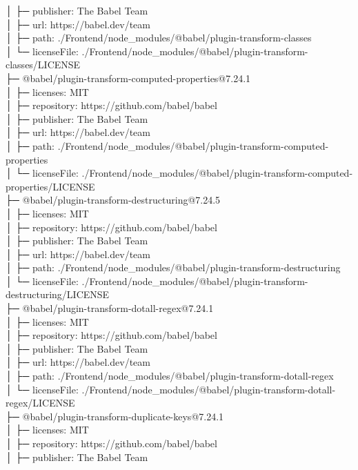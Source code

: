 │  ├─ publisher: The Babel Team\\
│  ├─ url: https://babel.dev/team\\
│  ├─ path: ./Frontend/node\_modules/@babel/plugin-transform-classes\\
│  └─ licenseFile: ./Frontend/node\_modules/@babel/plugin-transform-classes/LICENSE\\
├─ @babel/plugin-transform-computed-properties@7.24.1\\
│  ├─ licenses: MIT\\
│  ├─ repository: https://github.com/babel/babel\\
│  ├─ publisher: The Babel Team\\
│  ├─ url: https://babel.dev/team\\
│  ├─ path: ./Frontend/node\_modules/@babel/plugin-transform-computed-properties\\
│  └─ licenseFile: ./Frontend/node\_modules/@babel/plugin-transform-computed-properties/LICENSE\\
├─ @babel/plugin-transform-destructuring@7.24.5\\
│  ├─ licenses: MIT\\
│  ├─ repository: https://github.com/babel/babel\\
│  ├─ publisher: The Babel Team\\
│  ├─ url: https://babel.dev/team\\
│  ├─ path: ./Frontend/node\_modules/@babel/plugin-transform-destructuring\\
│  └─ licenseFile: ./Frontend/node\_modules/@babel/plugin-transform-destructuring/LICENSE\\
├─ @babel/plugin-transform-dotall-regex@7.24.1\\
│  ├─ licenses: MIT\\
│  ├─ repository: https://github.com/babel/babel\\
│  ├─ publisher: The Babel Team\\
│  ├─ url: https://babel.dev/team\\
│  ├─ path: ./Frontend/node\_modules/@babel/plugin-transform-dotall-regex\\
│  └─ licenseFile: ./Frontend/node\_modules/@babel/plugin-transform-dotall-regex/LICENSE\\
├─ @babel/plugin-transform-duplicate-keys@7.24.1\\
│  ├─ licenses: MIT\\
│  ├─ repository: https://github.com/babel/babel\\
│  ├─ publisher: The Babel Team\\
